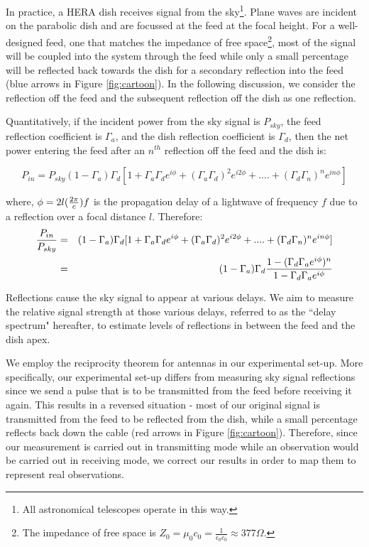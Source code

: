 \documentclass[12pt,preprint]{aastex}
\begin{document}
In practice, a HERA dish receives signal from the sky\footnote{All astronomical
telescopes operate in this way.}. Plane waves are incident on the parabolic dish and are focussed at the feed at the focal height. For a well-designed feed, one that matches the impedance of
free space\footnote{The impedance of free space is $Z_{0} = \mu_{0}c_{0} =
\frac{1}{\epsilon_{0}c_{0}} \approx 377\Omega $.}, most of the signal will be
coupled into the system through the feed while only a small percentage will be reflected
back towards the dish for a secondary reflection into the feed (blue arrows in
Figure \ref{fig:cartoon}). In the following discussion, we consider the reflection
off the feed and the subsequent reflection off the dish as one reflection.

Quantitatively, if the incident power from the sky signal is $P_{sky}$, the feed
reflection coefficient is $\Gamma_{a}$, and the dish reflection
coefficient is $\Gamma_{d}$, then the net power entering the feed after an
$n^{th}$ reflection off the feed and the dish is:

\begin{equation}
P_{in} =  P_{sky}(1-\Gamma_{a})\Gamma_{d} [1+ \Gamma_{a}\Gamma_{d} e^{i\phi}+ (\Gamma_{a}\Gamma_{d})^2e^{i2\phi}+ ....+ (\Gamma_{d}\Gamma_{n})^{n}e^{in\phi}]
\end{equation}

where, $\phi = 2l({2\pi \over c})f$ is the propagation delay of a lightwave of frequency $f$ due to a reflection over a focal distance $l$. 
Therefore:
\begin{eqnarray}
{P_{in} \over P_{sky} } & = & (1-\Gamma_{a})\Gamma_{d} [1+ \Gamma_{a}\Gamma_{d} e^{i\phi}+ (\Gamma_{a}\Gamma_{d})^2e^{i2\phi}+ ....+ (\Gamma_{d}\Gamma_{n})^{n}e^{in\phi}] \nonumber\\
      & = & (1-\Gamma_{a})\Gamma_{d} {1-(\Gamma_{d}\Gamma_{a}e^{i\phi})^{n} \over 1-\Gamma_{d} \Gamma_{a} e^{i\phi} } 
\end{eqnarray}

Reflections cause the sky signal to appear at various delays. We aim to measure the relative signal strength at those various delays, referred to as the ``delay spectrum" hereafter, to estimate levels of reflections in between the feed and the dish apex.
 
We employ the reciprocity theorem for antennas in our experimental set-up.
More specifically, our experimental set-up differs from measuring sky signal
reflections since we send a pulse that is to be transmitted from the feed
before receiving it again. This results in a reversed situation - most of our
original signal is transmitted from the feed to be reflected from the dish,
while a small percentage reflects back down the cable (red arrows in Figure
\ref{fig:cartoon}). Therefore, since our measurement is carried out in
transmitting mode while an observation would be carried out in receiving mode,
we correct our results in order to map them to represent real observations.
\end{document}

